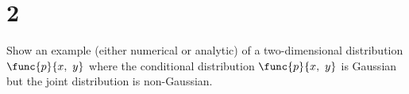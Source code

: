 \section{2}

Show an example (either numerical or analytic) of a two-dimensional distribution $\func{p}{x,\ y}$ where the conditional distribution $\func{p}{x,\ y}$ is Gaussian but the joint distribution is non-Gaussian.


